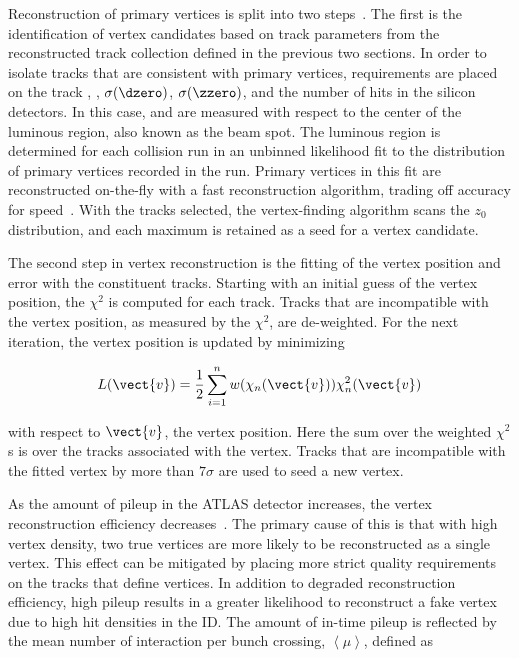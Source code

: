 Reconstruction of primary vertices is split into two
steps~\cite{bib:ATLAS-CONF-2010-069,bib:Piacquadio:2008zzb}. The first
is the identification of vertex candidates based on track parameters
from the reconstructed track collection defined in the previous two
sections. In order to isolate tracks that are consistent with primary
vertices, requirements are placed on the track \pt, \dzero,
$\sigma (\dzero)$, $\sigma (\zzero)$, and the number of hits in the silicon
detectors. In this case, \dzero and \zzero are measured with respect to the
center of the luminous region, also known as the beam spot. The
luminous region is determined for each collision run in an unbinned
likelihood fit to the distribution of primary vertices recorded in the
run. Primary vertices in this fit are reconstructed on-the-fly with a
fast reconstruction algorithm, trading off accuracy for
speed~\cite{bib:ATLAS-CONF-2010-027}. With the tracks selected, the
vertex-finding algorithm scans the $z_0$ distribution, and each maximum is
retained as a seed for a vertex candidate. 

The second step in vertex reconstruction is the fitting of the
vertex position and error with the constituent tracks. Starting with
an initial guess of the vertex position, the $\chi^2$ is computed for
each track. Tracks that are incompatible with the vertex position, as
measured by the $\chi^2$, are de-weighted. For the next iteration, the
vertex position is updated by minimizing

\begin{equation}
L(\vect{v}) = \frac{1}{2}\sum_{i=1}^{n} w(\chi_n(\vect{v})) \chi^2_n(\vect{v})
\end{equation}

\noindent
with respect to $\vect{v}$, the vertex position. Here the sum over the
weighted $\chi^2$s is over the tracks associated with the vertex. Tracks that are
incompatible with the fitted vertex by more than $7\sigma$ are used to
seed a new vertex. 

As the amount of pileup in the ATLAS detector increases, the vertex
reconstruction efficiency decreases~\cite{bib:2012jma}. The primary cause of this is that
with high vertex density, two true vertices are more likely to be
reconstructed as a single vertex. This effect can be mitigated by
placing more strict quality requirements on the tracks that define
vertices. In addition to degraded reconstruction efficiency, high
pileup results in a greater likelihood to reconstruct a fake vertex
due to high hit densities in the ID. The amount of in-time pileup is
reflected by the mean number of interaction per bunch crossing,
$\left \langle \mu \right \rangle$, defined as 

